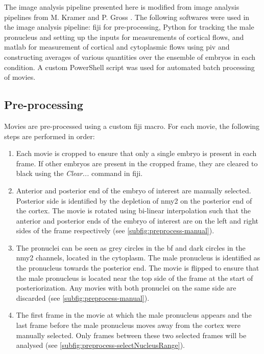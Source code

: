 The image analysis pipeline presented here is modified from image analysis pipelines from M. Kramer \citep{mirna2015linking} and P. Gross \citep{gross2019guiding}. The following softwares were used in the image analysis pipeline: \ac{fiji} \citep{schindelin2012fiji,linkert2010metadata} for pre-processing, Python \citep{python38} for tracking the male pronucleus and setting up the inputs for measurements of cortical flows, and \ac{matlab} \citep{MATLAB:2016a} for measurement of cortical and cytoplasmic flows using \acs{piv} and constructing averages of various quantities over the ensemble of embryos in each condition. A custom PowerShell script was used for automated batch processing of movies.

\subsection{Pre-processing}\label{subsec:preprocess}
Movies are pre-processed using a custom \ac{fiji} macro. For each movie, the following steps are performed in order:
\begin{enumerate}
    \item Each movie is cropped to ensure that only a single embryo is present in each frame. If other embryos are present in the cropped frame, they are cleared to black using the \emph{Clear...} command in \ac{fiji}.
    \item Anterior and posterior end of the embryo of interest are manually selected. Posterior side is identified by the depletion of \ac{nmy2} on the posterior end of the cortex. The movie is rotated using bi-linear interpolation such that the anterior and posterior ends of the embryo of interest are on the left and right sides of the frame respectively (see \autoref{subfig:preprocess-manual}).
    \item The pronuclei can be seen as grey circles in the \ac{bf} and dark circles in the \ac{nmy2} channels, located in the cytoplasm. The male pronucleus is identified as the pronucleus towards the posterior end. The movie is flipped to ensure that the male pronucleus is located near the top side of the frame at the start of posteriorization. Any movies with both pronuclei on the same side are discarded  (see \autoref{subfig:preprocess-manual}).
    \item The first frame in the movie at which the male pronucleus appears and the last frame before the male pronucleus moves away from the cortex were manually selected. Only frames between these two selected frames will be analysed  (see \autoref{subfig:preprocess-selectNucleusRange}).
\end{enumerate}

